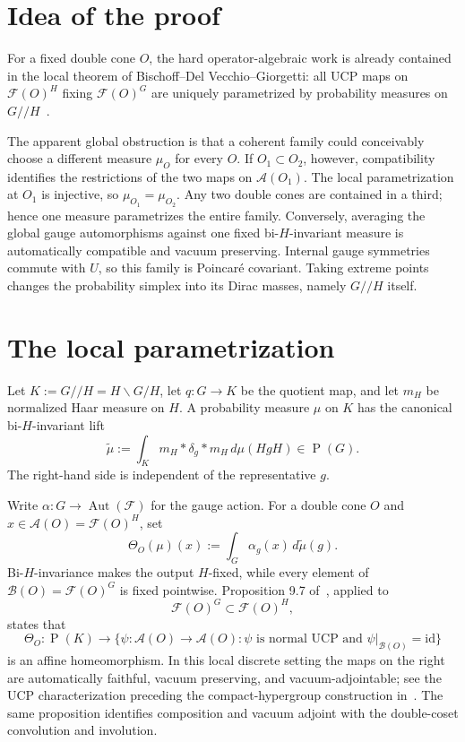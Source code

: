 \documentclass[11pt]{article}
\newcommand{\A}{\mathcal A}
\newcommand{\Bnet}{\mathcal B}
\newcommand{\F}{\mathcal F}
\newcommand{\Prob}{\operatorname{P}}
\begin{document}
\section{Idea of the proof}

For a fixed double cone $O$, the hard operator-algebraic work is already
contained in the local theorem of Bischoff--Del Vecchio--Giorgetti: all UCP
maps on $\F(O)^H$ fixing $\F(O)^G$ are uniquely parametrized by probability
measures on $G/\!/H$~\cite[Section 9.2, Proposition 9.7]{BDG}.

The apparent global obstruction is that a coherent family could conceivably
choose a different measure $\mu_O$ for every $O$.  If $O_1\subset O_2$,
however, compatibility identifies the restrictions of the two maps on
$\A(O_1)$.  The local parametrization at $O_1$ is injective, so
$\mu_{O_1}=\mu_{O_2}$.  Any two double cones are contained in a third; hence
one measure parametrizes the entire family.  Conversely, averaging the global
gauge automorphisms against one fixed bi-$H$-invariant measure is automatically
compatible and vacuum preserving.  Internal gauge symmetries commute with
$U$, so this family is Poincar\'e covariant.  Taking extreme points changes
the probability simplex into its Dirac masses, namely $G/\!/H$ itself.

\section{The local parametrization}

Let $K:=G/\!/H=H\backslash G/H$, let $q:G\to K$ be the quotient map, and let
$m_H$ be normalized Haar measure on $H$.  A probability measure $\mu$ on
$K$ has the canonical bi-$H$-invariant lift
\begin{equation}\label{eq:lift}
 \widetilde\mu
  :=\int_K m_H*\delta_g*m_H\,d\mu(HgH)\in\Prob(G).
\end{equation}
The right-hand side is independent of the representative $g$.

Write $\alpha:G\to\operatorname{Aut}(\F)$ for the gauge action.  For a double
cone $O$ and $x\in\A(O)=\F(O)^H$, set
\begin{equation}\label{eq:theta}
 \Theta_O(\mu)(x):=\int_G\alpha_g(x)\,d\widetilde\mu(g).
\end{equation}
Bi-$H$-invariance makes the output $H$-fixed, while every element of
$\Bnet(O)=\F(O)^G$ is fixed pointwise.  Proposition 9.7 of~\cite{BDG}, applied
to
\[
       \F(O)^G\subset\F(O)^H,
\]
states that
\begin{equation}\label{eq:localhomeo}
 \Theta_O:\Prob(K)\longrightarrow
 \{\psi:\A(O)\to\A(O):\psi\text{ is normal UCP and }
                       \psi|_{\Bnet(O)}=\mathrm{id}\}
\end{equation}
is an affine homeomorphism.  In this local discrete setting the maps on the
right are automatically faithful, vacuum preserving, and vacuum-adjointable;
see the UCP characterization preceding the compact-hypergroup construction
in~\cite[Sections 6--7]{BDG}.  The same proposition identifies composition
and vacuum adjoint with the double-coset convolution and involution.
\end{document}
